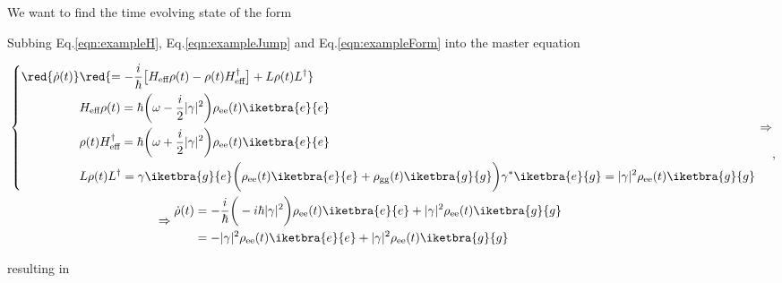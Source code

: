 We want to find the time evolving state of the form


Subbing    Eq.\eqref{eqn:exampleH},   Eq.\eqref{eqn:exampleJump}    and
Eq.\eqref{eqn:exampleForm} into the master equation

\begin{equation}
  \begin{aligned}
    & \left\lbrace
      \begin{aligned}
        \red{\dot{\rho}(t)} & \red{= -\frac{i}{\hbar}\big[H_\text{eff}\rho(t)-\rho(t)H_\text{eff}^\dagger\big] + L\rho(t)L^\dagger}\\
        & H_\text{eff}\rho(t) = \hbar\bigg(\omega-\frac{i}{2}|\gamma|^2\bigg)\rho_\text{ee}(t)\iketbra{e}{e}\\
        & \rho(t)H_\text{eff}^\dagger = \hbar\bigg(\omega+\frac{i}{2}|\gamma|^2\bigg)\rho_\text{ee}(t)\iketbra{e}{e}\\
        &                      L\rho(t)L^\dagger                      =
        \gamma\iketbra{g}{e}\bigg(\rho_\text{ee}(t)\iketbra{e}{e}     +
        \rho_\text{gg}(t)\iketbra{g}{g}\bigg)\gamma^*\iketbra{e}{g}   =
        |\gamma|^2\rho_\text{ee}(t)\iketbra{g}{g}
      \end{aligned}
    \right. \Rightarrow\\
    & \qquad\qquad\qquad\qquad\qquad\qquad\Rightarrow \begin{aligned}
      \dot{\rho}(t) & = -\frac{i}{\hbar}\bigg(-i\hbar|\gamma|^2\bigg)\rho_\text{ee}(t)\iketbra{e}{e}+|\gamma|^2\rho_\text{ee}(t)\iketbra{g}{g}\\
      &                                                               =
      -|\gamma|^2\rho_\text{ee}(t)\iketbra{e}{e}+|\gamma|^2\rho_\text{ee}(t)\iketbra{g}{g}
    \end{aligned}
  \end{aligned},
\end{equation}

\noindent resulting in

